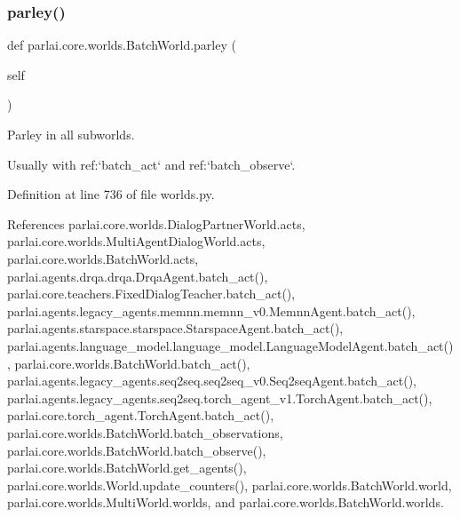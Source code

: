 \subsubsection{\texorpdfstring{parley()}{parley()}}
{\footnotesize\ttfamily def parlai.\+core.\+worlds.\+Batch\+World.\+parley (\begin{DoxyParamCaption}\item[{}]{self }\end{DoxyParamCaption})}

\begin{DoxyVerb}Parley in all subworlds.

Usually with ref:`batch_act` and ref:`batch_observe`.
\end{DoxyVerb}
 

Definition at line 736 of file worlds.\+py.



References parlai.\+core.\+worlds.\+Dialog\+Partner\+World.\+acts, parlai.\+core.\+worlds.\+Multi\+Agent\+Dialog\+World.\+acts, parlai.\+core.\+worlds.\+Batch\+World.\+acts, parlai.\+agents.\+drqa.\+drqa.\+Drqa\+Agent.\+batch\+\_\+act(), parlai.\+core.\+teachers.\+Fixed\+Dialog\+Teacher.\+batch\+\_\+act(), parlai.\+agents.\+legacy\+\_\+agents.\+memnn.\+memnn\+\_\+v0.\+Memnn\+Agent.\+batch\+\_\+act(), parlai.\+agents.\+starspace.\+starspace.\+Starspace\+Agent.\+batch\+\_\+act(), parlai.\+agents.\+language\+\_\+model.\+language\+\_\+model.\+Language\+Model\+Agent.\+batch\+\_\+act(), parlai.\+core.\+worlds.\+Batch\+World.\+batch\+\_\+act(), parlai.\+agents.\+legacy\+\_\+agents.\+seq2seq.\+seq2seq\+\_\+v0.\+Seq2seq\+Agent.\+batch\+\_\+act(), parlai.\+agents.\+legacy\+\_\+agents.\+seq2seq.\+torch\+\_\+agent\+\_\+v1.\+Torch\+Agent.\+batch\+\_\+act(), parlai.\+core.\+torch\+\_\+agent.\+Torch\+Agent.\+batch\+\_\+act(), parlai.\+core.\+worlds.\+Batch\+World.\+batch\+\_\+observations, parlai.\+core.\+worlds.\+Batch\+World.\+batch\+\_\+observe(), parlai.\+core.\+worlds.\+Batch\+World.\+get\+\_\+agents(), parlai.\+core.\+worlds.\+World.\+update\+\_\+counters(), parlai.\+core.\+worlds.\+Batch\+World.\+world, parlai.\+core.\+worlds.\+Multi\+World.\+worlds, and parlai.\+core.\+worlds.\+Batch\+World.\+worlds.

